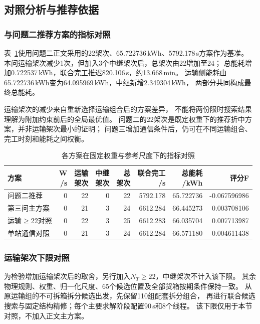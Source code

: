 \subsection{对照分析与推荐依据}
\subsubsection{与问题二推荐方案的指标对照}
表~\ref{tab:q3-comparison}使用问题二正文采用的22架次、65.722736\,kWh、5792.178\,s方案作为基准。
本问运输架次减少1次，但加入3个中继架次后，总架次由22增加至24；
总能耗增加0.722537\,kWh，联合完工推迟820.106\,s，约13.668\,min。
运输侧能耗由65.722736\,kWh变为64.095969\,kWh，中继新增2.349304\,kWh，
两部分共同构成最终总能耗。

运输架次的减少来自重新选择运输组合后的方案差异，
不能将两份限时搜索结果理解为附加约束前后的全局最优值。
问题二的22架次是既定权重下的推荐折中方案，并非运输架次最小的证明；
问题三增加通信条件后，仍可在不同运输组合、完工时刻和能耗之间权衡。
\begin{table}[!htbp]
\centering
\footnotesize
\setlength{\tabcolsep}{3pt}
\renewcommand{\arraystretch}{1.10}
\caption{各方案在固定权重与参考尺度下的指标对照}\label{tab:q3-comparison}
\begin{tabular}{@{}lrrrrrrr@{}}
\toprule
方案 & \shortstack{W\\/s} & \shortstack{运输\\架次} & \shortstack{中继\\架次} & \shortstack{总\\架次} & \shortstack{联合完工\\/s} & \shortstack{总能耗\\/kWh} & 评分F \\
\midrule
问题二推荐 & 0 & 22 & 0 & 22 & 5792.178 & 65.722736 & -0.067596986 \\
第三问主方案 & 0 & 21 & 3 & 24 & 6612.284 & 66.445273 & 0.003708106 \\
运输$\ge$22对照 & 0 & 22 & 3 & 25 & 6612.283 & 66.035704 & 0.007713987 \\
单站通信对照 & 0 & 21 & 3 & 24 & 6612.284 & 66.571180 & 0.004611438 \\
\bottomrule
\end{tabular}
\end{table}


\subsubsection{运输架次下限对照}
为检验增加运输架次后的取舍，另行加入$N_T\ge22$，中继架次不计入该下限。
其余物理规则、权重、归一化尺度、65个候选位置及全部货箱按期条件保持一致。
从原运输组的不可拆箱拆分候选出发，先保留110组配套拆分组合，
再进行联合候选搜索与固定结构精修；每个主要求解阶段配置90\,s和8个线程。
该下限仅用于本节对照，不加入正文主方案。

